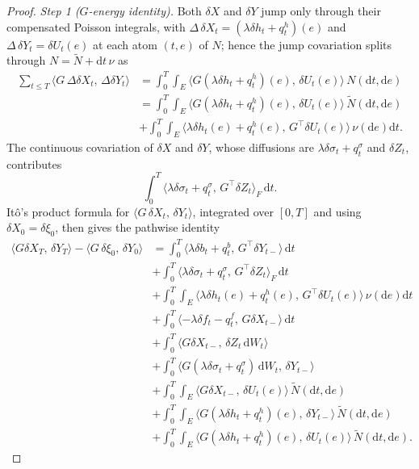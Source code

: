 \documentclass[preprint,12pt]{elsarticle}
\newcommand{\diff}{\mathrm{d}}
\newcommand{\Nt}{\widetilde{N}}
\newcommand{\inner}[2]{\langle #1,\,#2\rangle}
\newcommand{\Gstar}{G^{\!\top}}
\numberwithin{equation}{section}
\theoremstyle{plain}
\theoremstyle{definition}
\theoremstyle{\PaperRemarkStyle}
\begin{document}
\begin{proof}
\emph{Step 1 ($G$-energy identity).} Both $\delta X$ and $\delta Y$ jump only through
their compensated Poisson integrals, with $\Delta\,\delta X_t=(\lambda\delta h_t+q^h_t)(e)$
and $\Delta\,\delta Y_t=\delta U_t(e)$ at each atom $(t,e)$ of $N$; hence the jump
covariation splits through $N=\Nt+\diff t\,\nu$ as
\[
\begin{aligned}
\sum_{t\le T}\inner{G\,\Delta\delta X_t}{\Delta\delta Y_t}
&=\int_0^T\!\!\int_E\inner{G(\lambda\delta h_t+q^h_t)(e)}{\delta U_t(e)}\,N(\diff t,\diff e)\\
&=\int_0^T\!\!\int_E\inner{G(\lambda\delta h_t+q^h_t)(e)}{\delta U_t(e)}\,\Nt(\diff t,\diff e)\\
&+\int_0^T\!\!\int_E\inner{\lambda\delta h_t(e)+q^h_t(e)}{\Gstar\delta U_t(e)}\,\nu(\diff e)\diff t .
\end{aligned}
\]
The continuous covariation of $\delta X$ and $\delta Y$, whose diffusions are
$\lambda\delta\sigma_t+q^\sigma_t$ and $\delta Z_t$, contributes
\[
\int_0^T\inner{\lambda\delta\sigma_t+q^\sigma_t}{\Gstar\delta Z_t}_F\,\diff t .
\]
It\^o's product formula for $\inner{G\,\delta X_t}{\delta Y_t}$, integrated over $[0,T]$ and using
$\delta X_0=\delta\xi_0$, then gives the pathwise identity
\begin{equation}\label{eq:Gid-path}
\begin{aligned}
\inner{G\delta X_T}{\delta Y_T}-\inner{G\,\delta\xi_0}{\delta Y_0}
&=\int_0^T\inner{\lambda\delta b_t+q^b_t}{\Gstar\delta Y_{t-}}\,\diff t\\
&+\int_0^T\inner{\lambda\delta\sigma_t+q^\sigma_t}{\Gstar\delta Z_t}_F\,\diff t\\
&+\int_0^T\!\!\int_E\inner{\lambda\delta h_t(e)+q^h_t(e)}{\Gstar\delta U_t(e)}\,\nu(\diff e)\diff t\\
&+\int_0^T\inner{-\lambda\delta f_t-q^f_t}{G\delta X_{t-}}\,\diff t\\
&+\int_0^T\inner{G\delta X_{t-}}{\delta Z_t\,\diff W_t}\\
&+\int_0^T\inner{G(\lambda\delta\sigma_t+q^\sigma_t)\,\diff W_t}{\delta Y_{t-}}\\
&+\int_0^T\!\!\int_E\inner{G\delta X_{t-}}{\delta U_t(e)}\,\Nt(\diff t,\diff e)\\
&+\int_0^T\!\!\int_E\inner{G(\lambda\delta h_t+q^h_t)(e)}{\delta Y_{t-}}\,\Nt(\diff t,\diff e)\\
&+\int_0^T\!\!\int_E\inner{G(\lambda\delta h_t+q^h_t)(e)}{\delta U_t(e)}\,\Nt(\diff t,\diff e) .
\end{aligned}
\end{equation}

\end{proof}
\end{document}
